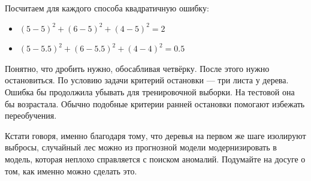 \documentclass[12pt, a4paper, oneside]{article}
\theoremstyle{plain} %
\theoremstyle{definition}
\begin{document}
\begin{solution}
Посчитаем для каждого способа квадратичную ошибку: 

\begin{itemize}
	\item  $ (5 - 5)^2 + (6 - 5)^2 + (4 - 5)^2 = 2$
	\item  $ (5 - 5.5)^2 + (6 - 5.5)^2 + (4 - 4)^2  = 0.5$
\end{itemize}
	
Понятно, что дробить нужно, обосабливая четвёрку. После этого нужно остановиться. По условию задачи критерий остановки --- три листа у дерева. Ошибка бы продолжила убывать для тренировочной выборки. На тестовой она бы возрастала. Обычно подобные критерии ранней остановки помогают избежать переобучения.
	
Кстати говоря, именно благодаря тому, что деревья на первом же шаге изолируют выбросы, случайный лес можно из прогнозной модели модернизировать в модель, которая неплохо справляется с поиском аномалий. Подумайте на досуге о том, как именно можно сделать это. 
\end{solution}
\end{document}
